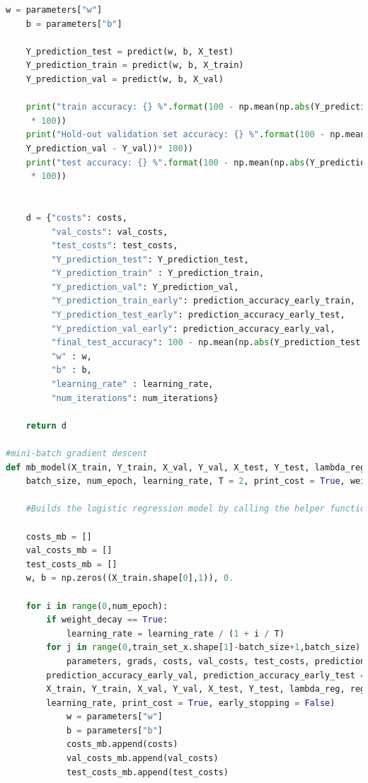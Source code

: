 \documentclass{article} %
\begin{document}
{\begin{lstlisting}[language=Python]
    w = parameters["w"]
    b = parameters["b"]
    
    Y_prediction_test = predict(w, b, X_test)
    Y_prediction_train = predict(w, b, X_train)
    Y_prediction_val = predict(w, b, X_val)

    print("train accuracy: {} %".format(100 - np.mean(np.abs(Y_prediction_train - Y_train))
	 * 100))
    print("Hold-out validation set accuracy: {} %".format(100 - np.mean(np.abs(
	Y_prediction_val - Y_val))* 100))
    print("test accuracy: {} %".format(100 - np.mean(np.abs(Y_prediction_test - Y_test))
	 * 100))

    
    d = {"costs": costs,
         "val_costs": val_costs,
         "test_costs": test_costs,
         "Y_prediction_test": Y_prediction_test, 
         "Y_prediction_train" : Y_prediction_train, 
         "Y_prediction_val": Y_prediction_val,
         "Y_prediction_train_early": prediction_accuracy_early_train,
         "Y_prediction_test_early": prediction_accuracy_early_test,
         "Y_prediction_val_early": prediction_accuracy_early_val,
         "final_test_accuracy": 100 - np.mean(np.abs(Y_prediction_test - Y_test)) * 100,
         "w" : w, 
         "b" : b,
         "learning_rate" : learning_rate,
         "num_iterations": num_iterations}
    
    return d

#mini-batch gradient descent
def mb_model(X_train, Y_train, X_val, Y_val, X_test, Y_test, lambda_reg, reg_type, 
	batch_size, num_epoch, learning_rate, T = 2, print_cost = True, weight_decay = False):

    #Builds the logistic regression model by calling the helper functions

    costs_mb = []
    val_costs_mb = []
    test_costs_mb = []
    w, b = np.zeros((X_train.shape[0],1)), 0.
    
    for i in range(0,num_epoch):
        if weight_decay == True:
            learning_rate = learning_rate / (1 + i / T)
        for j in range(0,train_set_x.shape[1]-batch_size+1,batch_size):
            parameters, grads, costs, val_costs, test_costs, prediction_accuracy_early_train, 
	    prediction_accuracy_early_val, prediction_accuracy_early_test = optimize(w, b, 
	    X_train, Y_train, X_val, Y_val, X_test, Y_test, lambda_reg, reg_type, 1, 
	    learning_rate, print_cost = True, early_stopping = False)
            w = parameters["w"]
            b = parameters["b"]
            costs_mb.append(costs)
            val_costs_mb.append(val_costs)
            test_costs_mb.append(test_costs)
    

\end{lstlisting}}
\end{document}
